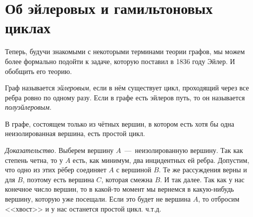\newpage
\section{Об эйлеровых и гамильтоновых циклах}

Теперь, будучи знакомыми с некоторыми терминами теории графов, мы можем более формально подойти к задаче, которую поставил в 1836 году Эйлер. И обобщить его теорию.


\begin{definition}
	Граф называется \emph{эйлеровым}, если в нём существует цикл, проходящий через все ребра ровно по одному разу. Если в графе есть эйлеров путь, то он называется \emph{полуэйлеровым}.
\end{definition}

\begin{lemma}
	В графе, состоящем только из чётных вершин, в котором есть хотя бы одна неизолированная вершина, есть простой цикл. 
	
	\emph{Доказательство.} Выберем вершину $A$~---~неизолированную вершину. Так как степень четна, то у $A$ есть, как минимум, два инцидентных ей ребра. Допустим, что одно из этих рёбер соединяет $A$ с вершиной $B$. Те же рассуждения верны и для $B$, поэтому есть вершина $C$, которая смежна $B$. И так далее. Так как у нас конечное число вершин, то в какой-то момент мы вернемся в какую-нибудь вершину, которую уже посещали. Если это будет не вершина $A$, то отбросим <<хвост>> и у нас останется простой цикл. ч.т.д.
\end{lemma}

